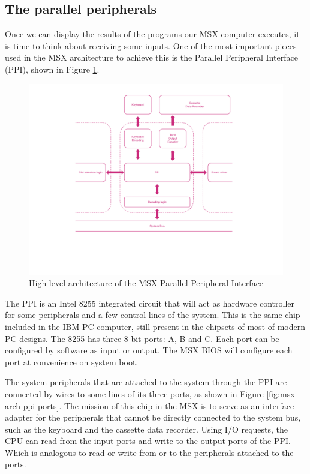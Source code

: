 \subsection{The parallel peripherals}

Once we can display the results of the programs our MSX computer executes, it is time to think about receiving some inputs. One of the most important pieces used in the MSX architecture to achieve this is the Parallel Peripheral Interface (PPI), shown in Figure \ref{fig:msx-arch-ppi}.

\begin{figure}
	\centering
	\includegraphics[width=1\linewidth,trim={0cm 100 0 20},clip]{images/figures/msx-arch-ppi}
	\caption{High level architecture of the MSX Parallel Peripheral Interface}
	\label{fig:msx-arch-ppi}
\end{figure}

The PPI is an Intel 8255 integrated circuit that will act as hardware controller for some peripherals and a few control lines of the system. This is the same chip included in the IBM PC computer, still present in the chipsets of most of modern PC designs. The 8255 has three 8-bit ports: A, B and C. Each port can be configured by software as input or output. The MSX BIOS will configure each port at convenience on system boot. 

The system peripherals that are attached to the system through the PPI are connected by wires to some lines of its three ports, as shown in Figure \ref{fig:msx-arch-ppi-ports}. The mission of this chip in the MSX is to serve as an interface adapter for the peripherals that cannot be directly connected to the system bus, such as the keyboard and the cassette data recorder. Using I/O requests, the CPU can read from the input ports and write to the output ports of the PPI. Which is analogous to read or write from or to the peripherals attached to the ports.

